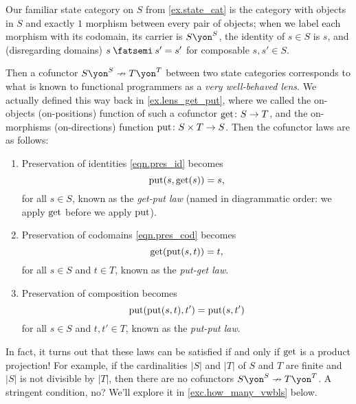 \documentclass[Book-Poly]{subfiles}
\begin{document}

\begin{example} \label{ex.very_well_behaved_lenses}
Our familiar state category on $S$ from \cref{ex.state_cat} is the category with objects in $S$ and exactly $1$ morphism between every pair of objects; when we label each morphism with its codomain, its carrier is $S\yon^S$, the identity of $s\in S$ is $s$, and (disregarding domains) $s\then s'=s'$ for composable $s,s'\in S$.

Then a cofunctor $S\yon^S\cof T\yon^T$ between two state categories corresponds to what is known to functional programmers as a \emph{very well-behaved lens}.
We actually defined this way back in \cref{ex.lens_get_put}, where we called the on-objects (on-positions) function of such a cofunctor $\mathrm{get}\colon S\to T$, and the on-morphisms (on-directions) function $\mathrm{put}\colon S\times T\to S$.%
Then the cofunctor laws are as follows:
\begin{enumerate}
    \item Preservation of identities \eqref{eqn.pres_id} becomes
    \[
        \mathrm{put}(s,\mathrm{get}(s))=s,
    \]
    for all $s\in S$, known as the \emph{get-put law} (named in diagrammatic order: we apply $\mathrm{get}$ before we apply $\mathrm{put}$).
    
    \item Preservation of codomains \eqref{eqn.pres_cod} becomes
    \[
        \mathrm{get}(\mathrm{put}(s,t))=t,
    \]
    for all $s\in S$ and $t\in T$, known as the \emph{put-get law}.
    
    \item Preservation of composition becomes
    \[
        \mathrm{put}(\mathrm{put}(s,t),t')=\mathrm{put}(s,t')
    \]
    for all $s\in S$ and $t,t'\in T$, known as the \emph{put-put law}.
\end{enumerate}

In fact, it turns out that these laws can be satisfied if and only if $\mathrm{get}$ is a product projection! 
For example, if the cardinalities $|S|$ and $|T|$ of $S$ and $T$ are finite and $|S|$ is not divisible by $|T|$, then there are no cofunctors $S\yon^S\cof T\yon^T$.
A stringent condition, no?
We'll explore it in  \cref{exc.how_many_vwbls} below.


\end{example}
\end{document}
